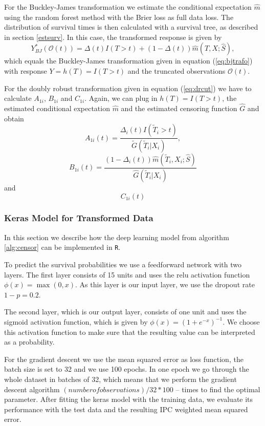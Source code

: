 \documentclass[12pt, a4paper]{scrartcl}
\theoremstyle{definition}
\theoremstyle{plain}
\numberwithin{equation}{section}
\numberwithin{figure}{section}
\numberwithin{table}{section}
\begin{document}
	For the Buckley-James transformation we estimate the conditional expectation $\hat{m}$ using the random forest method with the Brier loss as full data loss.
	The distribution of survival times is then calculated with a survival tree, as described in section \ref{estsurv}.
	In this case, the transformed response is given by
	\begin{equation*}
	Y^*_{BJ}(\mathcal{O}(t)) = \Delta(t)I(T>t)+ (1-\Delta(t))\hat{m}(T, X; \hat{S}),
	\end{equation*}
	which equals the Buckley-James transformation given in equation (\ref{eq:bjtrafo}) with response $Y=h(T)=I(T>t)$ and the truncated observations $\mathcal{O}(t)$.
	
	For the doubly robust transformation given in equation (\ref{eq:drcut}) we have to calculate $A_{1i}$, $B_{1i}$ and $C_{1i}$.
	Again, we can plug in $h(T)=I(T>t)$, the estimated conditional expectation $\hat{m}$ and the estimated censoring function $\hat{G}$ and obtain
	\begin{equation*}
		A_{1i}(t)=\frac{\Delta_i(t)I(\tilde{T}_i >t)}{\tilde{G}(\tilde{T}_i\vert X_i)},
	\end{equation*}
	\begin{equation*}
		B_{1i}(t) = \frac{(1-\Delta_i(t))\hat{m}(\tilde{T}_i, X_i; \hat{S})}{\hat{G}(\tilde{T}_i \vert X_i)}
	\end{equation*}
	and
	\begin{equation*}
	C_{1i}(t)
	\end{equation*}
	\subsubsection{Keras Model for Transformed Data}\label{keras}
	
	In this section we describe how the deep learning model from algorithm \ref{alg:censor} can be implemented in \texttt{R}.
	
	To predict the survival probabilities we use a feedforward network with two layers.
	The first layer consists of 15 units and uses the relu activation function $\phi(x) = \max(0, x)$.
	As this layer is our input layer, we use the dropout rate $1-p=0.2$.
	
	The second layer, which is our output layer, consists of one unit and uses the sigmoid activation function, which is given by $\phi(x)=(1+e^{-x})^{-1}$.
	We choose this activation function to make sure that the resulting value can be interpreted as a probability.
	
	For the gradient descent we use the mean squared error as loss function, the batch size is set to 32 and we use 100 epochs.
	In one epoch we go through the whole dataset in batches of 32, which means that we perform the gradient descent algorithm $(number of observations)/32*100$ -- times to find the optimal parameter.
	After fitting the keras model with the training data, we evaluate its performance with the test data and the resulting IPC weighted mean squared error.
	
\end{document}
